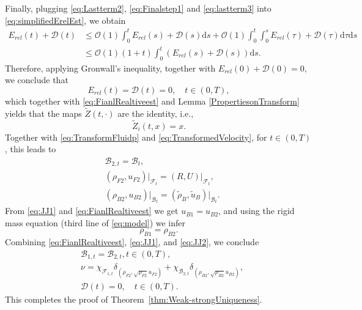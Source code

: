 \documentclass[11pt,twoside,reqno]{amsart}
\numberwithin{equation}{section}
\numberwithin{figure}{section}
\newcommand{\qnt}[1]{\left(#1\right)}
\begin{document}
Finally, plugging \eqref{eq:Lastterm2}, \eqref{eq:Finalstep1} and \eqref{eq:lastterm3} into \eqref{eq:simplifiedErelEst}, we obtain
\begin{equation}
    \begin{aligned}
        E_{rel}(t)+\mathcal{D}(t)&\leq\mathcal{O}(1)\int_0^t E_{rel}(s)+\mathcal{D}(s)\mathrm{d}s+\mathcal{O}(1)\int_0^t\int_0^sE_{rel}(\tau)+\mathcal{D}(\tau)\mathrm{d}\tau \mathrm{d}s\\&\leq\mathcal{O}(1)\qnt{1+t}\int_0^t\qnt{E_{rel}(s)+\mathcal{D}(s)}\mathrm{d}s.
    \end{aligned} 
\end{equation}
Therefore, applying Gronwall's inequality, together with $E_{rel}(0)+\mathcal{D}(0)=0,$ we conclude that 
\begin{equation}\label{eq:FianlRealtiveest}
    E_{rel}(t)=\mathcal{D}(t)=0,\quad t\in (0,T),
\end{equation}
which together with  \eqref{eq:FianlRealtiveest} and Lemma \ref{PropertiesonTransform} yields that the maps $\tilde{Z}(t,\cdot)$ are the identity, i.e., 
\begin{equation}
    \tilde{Z}_i(t,x)=x.
\end{equation}
Together with \eqref{eq:TransformFluidp} and \eqref{eq:TransformedVelocity}, for $t\in(0,T)$, this leads to 
\begin{equation}\label{eq:JJ1}
    \begin{aligned}
       &\mathcal{B}_{2,t}=\mathcal{B}_{t},  \\
       &(\rho_{F2},u_{{F2}})\big|_{\mathcal{F}_t}=(R,U)\big|_{\mathcal{F}_t},\\
       &(\rho_{B2},u_{B2})\big|_{\mathcal{B}_t}=(\tilde{\rho}_B,\tilde{u}_B)\big|_{\mathcal{B}_t}.
    \end{aligned}
\end{equation}
From \eqref{eq:JJ1} and \eqref{eq:FianlRealtiveest} we get \(u_{B1}=u_{B2}\), and using the rigid mass equation (third line of \eqref{eq:model}) we infer
\begin{equation}\label{eq:JJ2}
\rho_{B1}=\rho_{B2}.
\end{equation}
Combining \eqref{eq:FianlRealtiveest}, \eqref{eq:JJ1}, and \eqref{eq:JJ2}, we conclude
\begin{equation}
    \begin{aligned}
        &\mathcal{B}_{1,t}=\mathcal{B}_{2,t}, t\in (0,T),\\
        &\nu=\chi_{\mathcal{F}_{1,t}}\delta_{(\rho_{F2},\sqrt{\rho_{F2}}u_{F2})}+\chi_{\mathcal{B}_{2,t}}\delta_{(\rho_{B2},\sqrt{\rho_{B2}}u_{B2})},\\
        &\mathcal{D}(t)=0,\quad t\in(0,T).
    \end{aligned}
\end{equation}
This completes the proof of Theorem~\ref{thm:Weak-strongUniqueness}.
\end{document}
